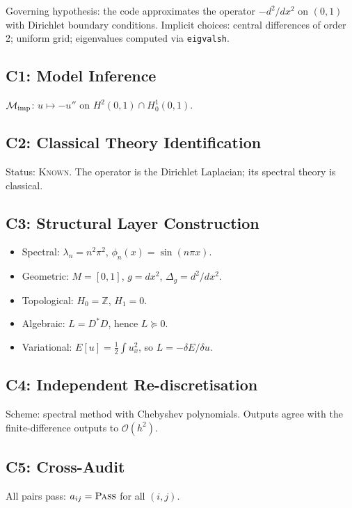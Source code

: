 \documentclass[11pt,a4paper]{article}
\theoremstyle{definition}
\theoremstyle{plain}
\newcommand{\Mcal}{\mathcal{M}}
\newcommand{\Z}{\mathbb{Z}}
\newcommand{\STPASS}{\textsc{Pass}}
\begin{document}
Governing hypothesis: the code approximates the operator
$-d^2/dx^2$ on $(0,1)$ with Dirichlet boundary conditions. Implicit
choices: central differences of order 2; uniform grid; eigenvalues
computed via \texttt{eigvalsh}.

\subsection{C1: Model Inference}

$\Mcal_{\rm imp}$: $u \mapsto -u''$ on $H^2(0,1) \cap H_0^1(0,1)$.

\subsection{C2: Classical Theory Identification}

Status: \textsc{Known}. The operator is the Dirichlet Laplacian;
its spectral theory is classical.

\subsection{C3: Structural Layer Construction}

\begin{itemize}
  \item Spectral: $\lambda_n = n^2 \pi^2$, $\phi_n(x) = \sin(n \pi x)$.
  \item Geometric: $M = [0,1]$, $g = dx^2$, $\Delta_g = d^2/dx^2$.
  \item Topological: $H_0 = \Z$, $H_1 = 0$.
  \item Algebraic: $L = D^\ast D$, hence $L \succeq 0$.
  \item Variational: $E[u] = \frac{1}{2}\int u_x^2$, so
        $L = -\delta E/\delta u$.
\end{itemize}

\subsection{C4: Independent Re-discretisation}

Scheme: spectral method with Chebyshev polynomials. Outputs agree
with the finite-difference outputs to $\mathcal{O}(h^2)$.

\subsection{C5: Cross-Audit}

All pairs pass: $a_{ij} = \STPASS$ for all $(i,j)$.
\end{document}
